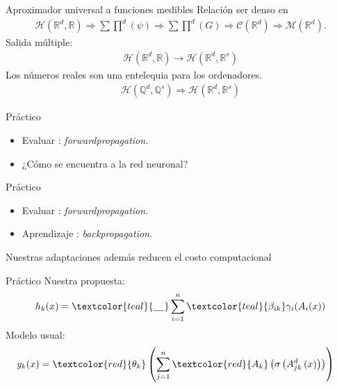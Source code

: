 \documentclass{beamer}
\newcommand{\R}{\mathbb{R}}
\newcommand{\Q}{\mathbb{Q}}
\newcommand{\pmcg}{ \sum \prod^d (G)} %
\newcommand{\fC}{\mathcal{C}(\R^d)} %
\newcommand{\fM}{\mathcal{M}(\R^d)} %
\newcommand{\rrnn}{ \mathcal{H}(\R^d,\R)} %
\newcommand{\rrnng}{ \sum \prod^d (\psi)} %
\newcommand{\rrnnmc}{ \mathcal{H}(\R^d,\R^s)}
\begin{document}
\begin{frame}{Aproximador universal a funciones medibles}
    Relación ser denso en 
    \begin{align*}
        \rrnn 
            \Rightarrow  
        \rrnng 
            \Rightarrow
        \pmcg
            \Rightarrow  
        \fC    
            \Rightarrow 
        \fM .
    \end{align*}
    \pause
    Salida múltiple: 
    \begin{align*}
        \rrnn 
            \longrightarrow 
        \rrnnmc
    \end{align*}
    \pause
    Los números reales son una entelequia para los ordenadores. 
    \begin{align*}
       \mathcal{H}(\Q^d, \Q^s)
            \Rightarrow
        \rrnnmc
    \end{align*}
\end{frame}
\begin{frame}{Práctico}
    \pause
    \begin{itemize}
        \item Evaluar \textcolor{teal}{\checkmark}: \textit{forwardpropagation}.
        \item ¿Cómo se encuentra a la red neuronal?
    \end{itemize}
\end{frame}
\begin{frame}{Práctico}
    \begin{itemize}
        \item Evaluar \textcolor{teal}{\checkmark}: \textit{forwardpropagation}.
        \item Aprendizaje \textcolor{teal}{\checkmark}:  \textit{backpropagation}.
    \end{itemize}
    \pause 
    Nuestras adaptaciones además reducen el costo computacional
\end{frame}
\begin{frame}{Práctico}
    Nuestra propuesta: 
    \begin{align*}
                h_k(x) = 
                \textcolor{teal}{\underline{\hspace{0.4cm}}}\sum_{i=1}^{n} \textcolor{teal}{\beta_{i k}} \gamma_{i}( A_{i}(x))
    \end{align*}
    Modelo usual:
    \begin{align*}
        y_k(x) &= 
        \textcolor{red}{\theta_k}
        \left( 
            \sum^n_{j=1} \textcolor{red}{A_{k}}
            \left(
                \sigma 
                \left(
                    A^{d}_{j k}
                    \left(
                        x
                    \right)
                \right)
            \right)
        \right)
    \end{align*}
\end{frame}
\end{document}
